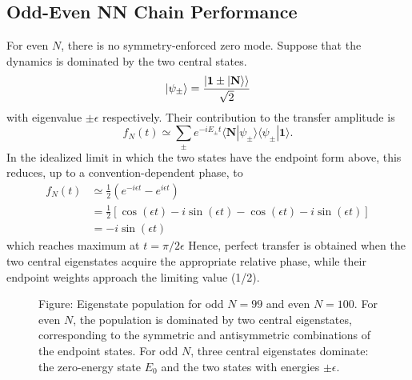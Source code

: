 \documentclass[../../../main.tex]{subfiles}
\begin{document}
\subsection{Odd-Even NN Chain Performance}
For even \(N\), there is no symmetry-enforced zero mode.
Suppose that the dynamics is dominated by the two central states.
\begin{equation*}
  \ket{\psi_\pm} = \frac{\ket{\mathbf{1 }\pm \ket{\mathbf{N } } } }{\sqrt{2}}
\end{equation*}
with eigenvalue $\pm \epsilon$ respectively.
Their contribution to the transfer amplitude is
\begin{equation*}
  f_{N}(t)
  \simeq
  \sum_{\pm}
  e^{-iE_\pm t}
  \langle\mathbf N|\psi_\pm\rangle
  \langle\psi_\pm|\mathbf1\rangle .
\end{equation*}
In the idealized limit in which the two states have the endpoint form above, this reduces, up to a convention-dependent phase, to
\begin{align*}
  f_{N}(t) & \simeq
  \frac12
  \left(e^{-i\epsilon t}-e^{i\epsilon t}\right) \\
           & =
  \frac{1}{2}
  \left[
    \cos(\epsilon t)-i\sin(\epsilon t)
    -
    \cos(\epsilon t)-i\sin(\epsilon t)
  \right]                                       \\
           & =
  -i\sin(\epsilon t)
\end{align*}
which reaches maximum at $t=\pi/2\epsilon$
Hence, perfect transfer is obtained when the two central eigenstates acquire the appropriate relative phase, while their endpoint weights approach the limiting value (1/2).

\begin{figure}
  \centering
  \caption*{Figure: Eigenstate population for odd $N=99$ and even $N=100$. For even $N$, the population is dominated by two central eigenstates, corresponding to the symmetric and antisymmetric combinations of the endpoint states. For odd $N$, three central eigenstates dominate: the zero-energy state $E_0$ and the two states with energies $\pm\epsilon$.}
\end{figure}
\end{document}

